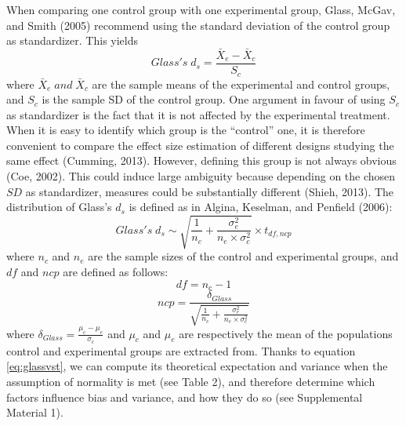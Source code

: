 \documentclass[
  english,
  man,floatsintext]{apa6}
\begin{document}
When comparing one control group with one experimental group, Glass, McGav, and Smith (2005) recommend using the standard deviation of the control group as standardizer. This yields
\begin{equation*} 
Glass's \; d_s = \frac{\bar{X}_{e} - \bar{X}_{c}}{S_{c}}
\label{eq:Glassds}
\end{equation*}
where \(\bar{X}_{e} \; and \; \bar{X}_{c}\) are the sample means of the experimental and control groups, and \(S_{c}\) is the sample SD of the control group. One argument in favour of using \(S_c\) as standardizer is the fact that it is not affected by the experimental treatment. When it is easy to identify which group is the \enquote{control} one, it is therefore convenient to compare the effect size estimation of different designs studying the same effect (Cumming, 2013). However, defining this group is not always obvious (Coe, 2002). This could induce large ambiguity because depending on the chosen \(SD\) as standardizer, measures could be substantially different (Shieh, 2013). The distribution of Glass's \(d_{s}\) is defined as in Algina, Keselman, and Penfield (2006):
\begin{equation} 
Glass's \; d_s \sim \sqrt{\frac{1}{n_{c}}+\frac{\sigma_{e}^2}{n_{e} \times \sigma^2_{c}}} \times t_{df,ncp}
\label{eq:glassvst}
\end{equation}
where \(n_c\) and \(n_e\) are the sample sizes of the control and experimental groups, and \(df\) and \(ncp\) are defined as follows:
\begin{equation} 
df = n_{c}-1
\label{eq:glassdf}
\end{equation}
\begin{equation*} 
ncp = \frac{\delta_{Glass}}{\sqrt{\frac{1}{n_{c}} + \frac{\sigma_{e}^2}{n_{e} \times \sigma^2_{c}}}}
\label{eq:glassncp}
\end{equation*}
where \(\delta_{Glass} = \frac{\mu_{c}-\mu_{e}}{\sigma_{c}}\) and \(\mu_c\) and \(\mu_e\) are respectively the mean of the populations control and experimental groups are extracted from. Thanks to equation \ref{eq:glassvst}, we can compute its theoretical expectation and variance when the assumption of normality is met (see Table 2), and therefore determine which factors influence bias and variance, and how they do so (see Supplemental Material 1).
\end{document}
